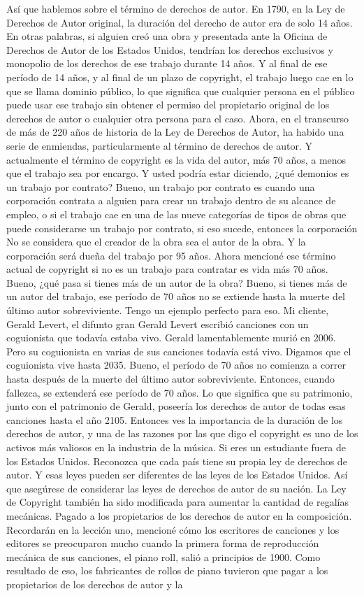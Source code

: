 \documentclass[10pt]{book}
\begin{document}
Así que hablemos sobre el término de derechos de autor. En 1790, en la Ley de Derechos de Autor original, la duración del derecho de autor era de solo 14 años. En otras palabras, si alguien creó una obra y presentada ante la Oficina de Derechos de Autor de los Estados Unidos, tendrían los derechos exclusivos y monopolio de los derechos de ese trabajo durante 14 años. Y al final de ese período de 14 años, y al final de un plazo de copyright, el trabajo luego cae en lo que se llama dominio público, lo que significa que cualquier persona en el público puede usar ese trabajo sin obtener el permiso del propietario original de los derechos de autor o cualquier otra persona para el caso. Ahora, en el transcurso de más de 220 años de historia de la Ley de Derechos de Autor, ha habido una serie de enmiendas, particularmente al término de derechos de autor. Y actualmente el término de copyright es la vida del autor, más 70 años, a menos que el trabajo sea por encargo. Y usted podría estar diciendo, ¿qué demonios es un trabajo por contrato? Bueno, un trabajo por contrato es cuando una corporación contrata a alguien para crear un trabajo dentro de su alcance de empleo, o si el trabajo cae en una de las nueve categorías de tipos de obras que puede considerarse un trabajo por contrato, si eso sucede, entonces la corporación No se considera que el creador de la obra sea el autor de la obra. Y la corporación será dueña del trabajo por 95 años. Ahora mencioné ese término actual de copyright si no es un trabajo para contratar es vida más 70 años. Bueno, ¿qué pasa si tienes más de un autor de la obra? Bueno, si tienes más de un autor del trabajo, ese período de 70 años no se extiende hasta la muerte del último autor sobreviviente. Tengo un ejemplo perfecto para eso. Mi cliente, Gerald Levert, el difunto gran Gerald Levert escribió canciones con un coguionista que todavía estaba vivo. Gerald lamentablemente murió en 2006. Pero su coguionista en varias de sus canciones todavía está vivo. Digamos que el coguionista vive hasta 2035. Bueno, el período de 70 años no comienza a correr hasta después de la muerte del último autor sobreviviente. Entonces, cuando fallezca, se extenderá ese período de 70 años. Lo que significa que su patrimonio, junto con el patrimonio de Gerald, poseería los derechos de autor de todas esas canciones hasta el año 2105. Entonces ves la importancia de la duración de los derechos de autor, y una de las razones por las que digo el copyright es uno de los activos más valiosos en la industria de la música. Si eres un estudiante fuera de los Estados Unidos. Reconozca que cada país tiene su propia ley de derechos de autor. Y esas leyes pueden ser diferentes de las leyes de los Estados Unidos. Así que asegúrese de considerar las leyes de derechos de autor de su nación. La Ley de Copyright también ha sido modificada para aumentar la cantidad de regalías mecánicas. Pagado a los propietarios de los derechos de autor en la composición. Recordarán en la lección uno, mencioné cómo los escritores de canciones y los editores se preocuparon mucho cuando la primera forma de reproducción mecánica de sus canciones, el piano roll, salió a principios de 1900. Como resultado de eso, los fabricantes de rollos de piano tuvieron que pagar a los propietarios de los derechos de autor y la 
\end{document}
